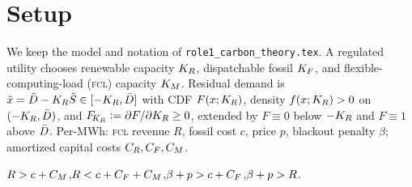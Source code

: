 \begin{abstract}
distribution-free structure alone. The residual
question is then the sign of a cutoff-computable benchmark $\Delta_0$ plus a density
tilt; numerically, at every large-\textsc{fcl} interior optimum scanned $\Delta_0<0$
($\Delta_0^{\max}\approx-1.09$) and the tilt reinforces it, $\Delta<0$
($\Delta^{\max}\approx-1.40$). Carbon strictly
falls only in the cheap-renewable corner $\KRs\to\infty$. So the honest reading is
\emph{negative}: interior carbon reduction is a corner phenomenon (the
small-\textsc{fcl} regime is Role~4's, not claimed here). \emph{Four}, the carbon-reduction set
$\{\CR:\Delta(\CR)\ge0\}$ is bounded above and non-empty---its non-emptiness
coming from that power-law corner, not from an interior optimum---and is a single
interval under an explicit monotone-renewable-shadow-value condition that, we note,
already encodes the single-crossing property it certifies.
\emph{Five}, the sharp necessary-and-sufficient condition for $\KRs>\KRo$ is the
\emph{path integral} of the realized endpoint gap; pointwise-monotone $g$ is
sufficient but not necessary; and the two-sided bounds on the carbon saving are
tight, attained by explicit degenerate conditional laws. Every identity is checked
against quadrature of the profit integral in \texttt{verify\_week2.py}.
\end{abstract}



\section{Setup}\label{r1w2-sec:setup}

We keep the model and notation of \texttt{role1\_carbon\_theory.tex}. A regulated
utility chooses renewable capacity $K_R$, dispatchable fossil $K_F$, and
flexible-computing-load (\textsc{fcl}) capacity $K_M$. Residual demand is
$\tilde x=\tilde D-K_R\tilde S\in[-K_R,\bar D]$ with CDF $F(x;K_R)$, density
$f(x;K_R)>0$ on $(-K_R,\bar D)$, and $F_{\!K_R}\vcentcolon=\partial F/\partial K_R\ge0$,
extended by $F\equiv0$ below $-K_R$ and $F\equiv1$ above $\bar D$. Per-MWh:
\textsc{fcl} revenue $R$, fossil cost $c$, price $p$, blackout penalty $\beta$;
amortized capital costs $C_R,C_F,C_M$.

\begin{assumption}\label{r1w2-ass:reg}
$R>c+C_M$,\quad $R<c+C_F+C_M$,\quad $\beta+p>c+C_F$,\quad $\beta+p>R$.
\end{assumption}

